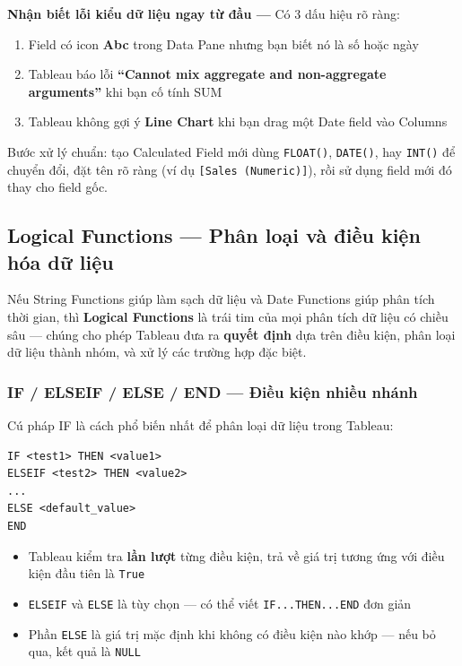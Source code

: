 \documentclass[12pt]{article}
\begin{document}
\begin{notebox}
\textbf{Nhận biết lỗi kiểu dữ liệu ngay từ đầu ---} Có 3 dấu hiệu rõ ràng:
\begin{enumerate}[nosep]
    \item Field có icon \textbf{Abc} trong Data Pane nhưng bạn biết nó là số hoặc ngày
    \item Tableau báo lỗi \textbf{``Cannot mix aggregate and non-aggregate arguments''} khi bạn cố tính SUM
    \item Tableau không gợi ý \textbf{Line Chart} khi bạn drag một Date field vào Columns
\end{enumerate}
\noindent Bước xử lý chuẩn: tạo Calculated Field mới dùng \texttt{FLOAT()}, \texttt{DATE()}, hay \texttt{INT()} để chuyển đổi, đặt tên rõ ràng (ví dụ \texttt{[Sales (Numeric)]}), rồi sử dụng field mới đó thay cho field gốc.
\end{notebox}

\subsection{Logical Functions --- Phân loại và điều kiện hóa dữ liệu}

\noindent Nếu String Functions giúp làm sạch dữ liệu và Date Functions giúp phân tích thời gian, thì \textbf{Logical Functions} là trái tim của mọi phân tích dữ liệu có chiều sâu --- chúng cho phép Tableau đưa ra \textbf{quyết định} dựa trên điều kiện, phân loại dữ liệu thành nhóm, và xử lý các trường hợp đặc biệt.

\subsubsection{IF / ELSEIF / ELSE / END --- Điều kiện nhiều nhánh}

\noindent Cú pháp IF là cách phổ biến nhất để phân loại dữ liệu trong Tableau:

\begin{aivncodebox}[]
\begin{lstlisting}
IF <test1> THEN <value1>
ELSEIF <test2> THEN <value2>
...
ELSE <default_value>
END
\end{lstlisting}
\end{aivncodebox}

\begin{itemize}[nosep]
    \item Tableau kiểm tra \textbf{lần lượt} từng điều kiện, trả về giá trị tương ứng với điều kiện đầu tiên là \texttt{True}
    \item \texttt{ELSEIF} và \texttt{ELSE} là tùy chọn --- có thể viết \texttt{IF...THEN...END} đơn giản
    \item Phần \texttt{ELSE} là giá trị mặc định khi không có điều kiện nào khớp --- nếu bỏ qua, kết quả là \texttt{NULL}
\end{itemize}
\end{document}

